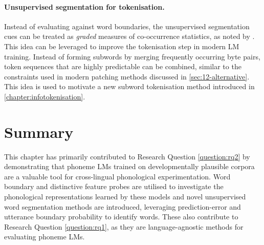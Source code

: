 \paragraph{Unsupervised segmentation for tokenisation.} Instead of evaluating against word boundaries, the unsupervised segmentation cues can be treated as \emph{graded} measures of co-occurrence statistics, as noted by \citet{elman1990finding}. This idea can be leveraged to improve the tokenisation step in modern LM training. Instead of forming subwords by merging frequently occurring byte pairs, token sequences that are highly predictable can be combined, similar to the constraints used in modern patching methods discussed in \cref{sec:12-alternative}. This idea is used to motivate a new subword tokenisation method introduced in \cref{chapter:infotokenisation}. 



\section{Summary}

This chapter has primarily contributed to Research Question \ref{question:rq2} by demonstrating that phoneme LMs trained on developmentally plausible corpora are a valuable tool for cross-lingual phonological experimentation. Word boundary and distinctive feature probes are utilised to investigate the phonological representations learned by these models and novel unsupervised word segmentation methods are introduced, leveraging prediction-error and utterance boundary probability to identify words. These also contribute to Research Question \ref{question:rq1}, as they are language-agnostic methods for evaluating phoneme LMs. 

